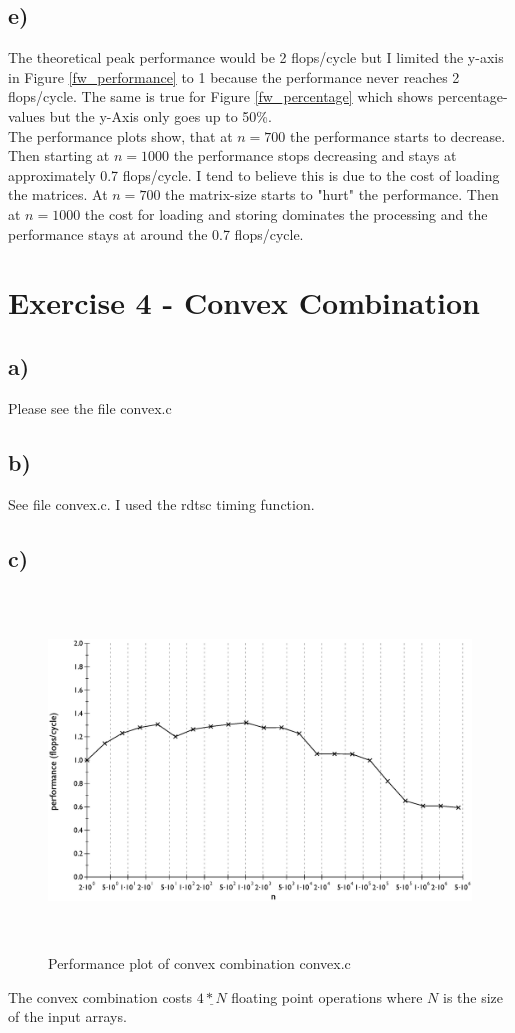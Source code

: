 \documentclass[10pt,a4paper,oneside,notitlepage]{report}
\begin{document}
\subsection*{e)}
The theoretical peak performance would be 2 flops/cycle but I limited the y-axis in Figure \ref{fw_performance} to 1 because the performance never reaches 2 flops/cycle. The same is true for Figure \ref{fw_percentage} which shows percentage-values but the y-Axis only goes up to 50\%. \\ 
The performance plots show, that at $n=700$ the performance starts to decrease. Then starting at $n=1000$ the performance stops decreasing and stays at approximately 0.7 flops/cycle. I tend to believe this is due to the cost of loading the matrices. At $n=700$ the matrix-size starts to "hurt" the performance. Then at $n=1000$ the cost for loading and storing dominates the processing and the performance stays at around the 0.7 flops/cycle.
\section*{Exercise 4 - Convex Combination}
\subsection*{a)}
Please see the file convex.c
\subsection*{b)}
See file convex.c. I used the rdtsc timing function.
\subsection*{c)}
\begin{figure}[H]
\caption{Performance plot of convex combination convex.c}
\includegraphics[height=9.5cm]{convex_performance}
\end{figure}
The convex combination costs $\underline{4*N}$ floating point operations where $N$ is the size of the input arrays.
\end{document}
